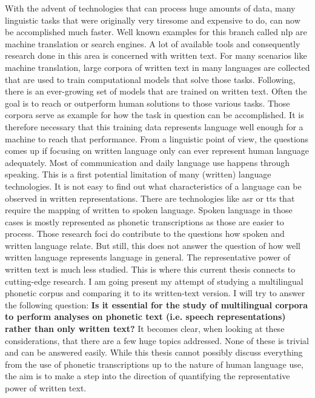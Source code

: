 
\label{chap:1_intro}

With the advent of technologies that can process huge amounts of data, many linguistic tasks that were originally very tiresome and expensive to do, can now be accomplished much faster. Well known examples for this branch called \ac{nlp} are machine translation or search engines. A lot of available tools and consequently research done in this area is concerned with written text. For many scenarios like machine translation, large corpora of written text in many languages are collected that are used to train computational models that solve those tasks. Following, there is an ever-growing set of models that are trained on written text. Often the goal is to reach or outperform human solutions to those various tasks. Those corpora serve as example for how the task in question can be accomplished. It is therefore necessary that this training data represents language well enough for a machine to reach that performance. From a linguistic point of view, the questions comes up if focusing on written language only can ever represent human language adequately. Most of communication and daily language use happens through speaking. This is a first potential limitation of many (written) language technologies. It is not easy to find out what characteristics of a language can be observed in written representations. There are technologies like \ac{asr} or \ac{tts} that require the mapping of written to spoken language. Spoken language in those cases is mostly represented as phonetic transcriptions as those are easier to process. Those research foci do contribute to the questions how spoken and written language relate. But still, this does not answer the question of how well written language represents language in general. The representative power of written text is much less studied. This is where this current thesis connects to cutting-edge research. I am going present my attempt of studying a multilingual phonetic corpus and comparing it to its written-text version. I will try to answer the following question: \textbf{Is it essential for the study of multilingual corpora to perform analyses on phonetic text (i.e. speech representations) rather than only written text?} It becomes clear, when looking at these considerations, that there are a few huge topics addressed. None of these is trivial and can be answered easily. While this thesis cannot possibly discuss everything from the use of phonetic transcriptions up to the nature of human language use, the aim is to make a step into the direction of quantifying the representative power of written text. 


